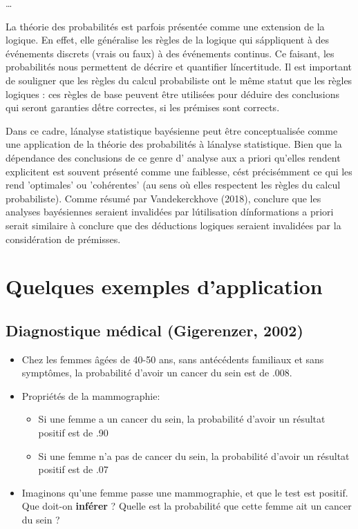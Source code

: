 \documentclass[
  a4paper,11pt,twoside,onecolumn,openright,final,oldfontcommands]{memoir}
\providecommand{\tightlist}{%
  \setlength{\itemsep}{0pt}\setlength{\parskip}{0pt}}
\theoremstyle{definition}
\theoremstyle{definition}
\theoremstyle{definition}
\theoremstyle{definition}
\theoremstyle{remark}
\begin{document}
\ldots{}

\begin{keyconcepts}{1.1}
La théorie des probabilités est parfois présentée comme une extension de la logique. En effet, elle généralise les règles de la logique qui s\' appliquent à des événements discrets (vrais ou faux) à des événements continus. Ce faisant, les probabilités nous permettent de décrire et quantifier l\' incertitude. Il est important de souligner que les règles du calcul probabiliste ont le même statut que les règles logiques : ces règles de base peuvent être utilisées pour déduire des conclusions qui seront garanties d\' être correctes, si les prémises sont corrects.

Dans ce cadre, l\' analyse statistique bayésienne peut être conceptualisée comme une application de la théorie des probabilités à l\'analyse statistique. Bien que la dépendance des conclusions de ce genre d' analyse aux a priori qu'elles rendent explicitent est souvent présenté comme une faiblesse, c\'est précisémment ce qui les rend 'optimales' ou 'cohérentes' (au sens où elles respectent les règles du calcul probabiliste). Comme résumé par Vandekerckhove (2018), conclure que les analyses bayésiennes seraient invalidées par l\' utilisation d\' informations a priori serait similaire à conclure que des déductions logiques seraient invalidées par la considération de prémisses.
\end{keyconcepts}

\hypertarget{quelques-exemples-dapplication}{%
\section{Quelques exemples d'application}\label{quelques-exemples-dapplication}}

\hypertarget{diagnostique-muxe9dical-gigerenzer-2002}{%
\subsection{Diagnostique médical (Gigerenzer, 2002)}\label{diagnostique-muxe9dical-gigerenzer-2002}}

\begin{itemize}
\item
  Chez les femmes âgées de 40-50 ans, sans antécédents familiaux et sans symptômes, la probabilité d'avoir un cancer du sein est de .008.
\item
  Propriétés de la mammographie:

  \begin{itemize}
  \tightlist
  \item
    Si une femme a un cancer du sein, la probabilité d'avoir un résultat positif est de .90
  \item
    Si une femme n'a pas de cancer du sein, la probabilité d'avoir un résultat positif est de .07
  \end{itemize}
\item
  Imaginons qu'une femme passe une mammographie, et que le test est positif. Que doit-on \textbf{inférer} ? Quelle est la probabilité que cette femme ait un cancer du sein ?
\end{itemize}
\end{document}
